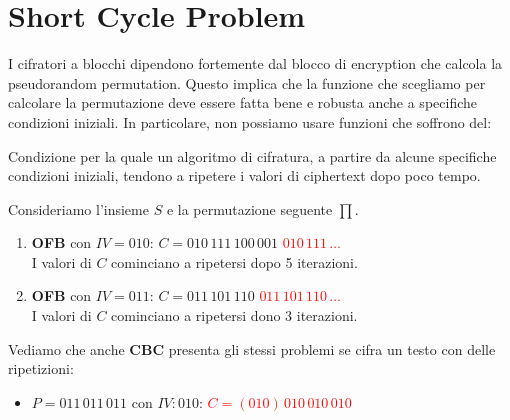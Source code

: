 \section{Short Cycle Problem}
I cifratori a blocchi dipendono fortemente dal blocco di encryption che calcola la pseudorandom permutation. Questo implica che la funzione che scegliamo per calcolare la permutazione deve essere fatta bene e robusta anche a specifiche condizioni iniziali. In particolare, non possiamo usare funzioni che soffrono del:
\begin{definition}\label{def:shortcycle}
Condizione per la quale un algoritmo di cifratura, a partire da alcune specifiche condizioni iniziali, tendono a ripetere i valori di ciphertext dopo poco tempo.
\end{definition}
\begin{example} Consideriamo l'insieme $S$ e la permutazione seguente $\prod$.
\begin{enumerate}
    \item \textbf{OFB} con $IV=010$: $C=010\,111\,100\,001$ \textcolor{red}{$010\,111\,\dots$}\\
    I valori di $C$ cominciano a ripetersi dopo 5 iterazioni.
    \item \textbf{OFB} con $IV=011$: $C=011\,101\,110$ \textcolor{red}{$011\,101\,110\,\dots$}\\
    I valori di $C$ cominciano a ripetersi dono 3 iterazioni.
\end{enumerate}
\end{example}
\begin{example}Vediamo che anche \textbf{CBC} presenta gli stessi problemi se cifra un testo con delle ripetizioni: 
\begin{itemize}
    \item $P=011\,011\,011$ con $IV:010$: \textcolor{red}{$C=(010)\,010\,010\,010$}
\end{itemize}
\end{example}
